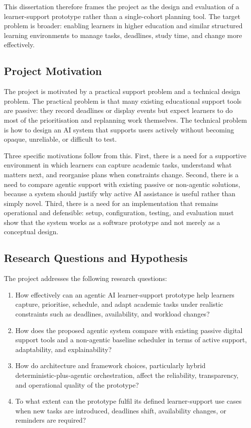 \documentclass[12pt]{article}
\begin{document}
This dissertation therefore frames the project as the design and evaluation of a learner-support prototype rather than a single-cohort planning tool. The target problem is broader: enabling learners in higher education and similar structured learning environments to manage tasks, deadlines, study time, and change more effectively.
\subsection{Project Motivation}
The project is motivated by a practical support problem and a technical design problem. The practical problem is that many existing educational support tools are passive: they record deadlines or display events but expect learners to do most of the prioritisation and replanning work themselves. The technical problem is how to design an AI system that supports users actively without becoming opaque, unreliable, or difficult to test.

Three specific motivations follow from this. First, there is a need for a supportive environment in which learners can capture academic tasks, understand what matters next, and reorganise plans when constraints change. Second, there is a need to compare agentic support with existing passive or non-agentic solutions, because a system should justify why active AI assistance is useful rather than simply novel. Third, there is a need for an implementation that remains operational and defensible: setup, configuration, testing, and evaluation must show that the system works as a software prototype and not merely as a conceptual design.

\subsection{Research Questions and Hypothesis}
The project addresses the following research questions:
\begin{enumerate}
\item How effectively can an agentic AI learner-support prototype help learners capture, prioritise, schedule, and adapt academic tasks under realistic constraints such as deadlines, availability, and workload changes?

\item How does the proposed agentic system compare with existing passive digital support tools and a non-agentic baseline scheduler in terms of active support, adaptability, and explainability?

\item How do architecture and framework choices, particularly hybrid deterministic-plus-agentic orchestration, affect the reliability, transparency, and operational quality of the prototype?

\item To what extent can the prototype fulfil its defined learner-support use cases when new tasks are introduced, deadlines shift, availability changes, or reminders are required?
\end{enumerate}
\end{document}
